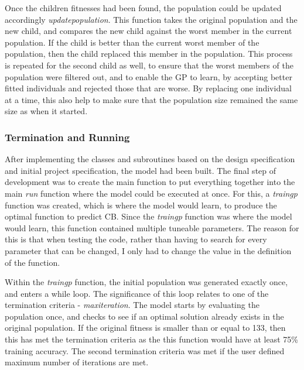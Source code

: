 \documentclass[11pt]{article}
\begin{document}
Once the children fitnesses had been found, the population could be updated accordingly \textit{update\textunderscore population}. This function takes the original population and the new child, and compares the new child against the worst member in the current population. If the child is better than the current worst member of the population, then the child replaced this member in the population. This process is repeated for the second child as well, to ensure that the worst members of the population were filtered out, and to enable the GP to learn, by accepting better fitted individuals and rejected those that are worse. By replacing one individual at a time, this also help to make sure that the population size remained the same size as when it started. 
\subsubsection{Termination and Running}\label{subsubsec:TR}
After implementing the classes and subroutines based on the design specification and initial project specification, the model had been built. The final step of development was to create the main function to put everything together into the main \textit{run} function where the model could be executed at once. For this, a \textit{train\textunderscore gp} function was created, which is where the model would learn, to produce the optimal function to predict CB. Since the \textit{train\textunderscore gp} function was where the model would learn, this function contained multiple tuneable parameters. The reason for this is that when testing the code, rather than having to search for every parameter that can be changed, I only had to change the value in the definition of the function.

Within the \textit{train\textunderscore gp} function, the initial population was generated exactly once, and enters a while loop. The significance of this loop relates to one of the termination criteria - \textit{max\textunderscore iteration}. The model starts by evaluating the population once, and checks to see if an optimal solution already exists in the original population. If the original fitness is smaller than or equal to 133, then this has met the termination criteria as the this function would have at least 75\% training accuracy. The second termination criteria was met if the user defined maximum number of iterations are met. 
\end{document}
